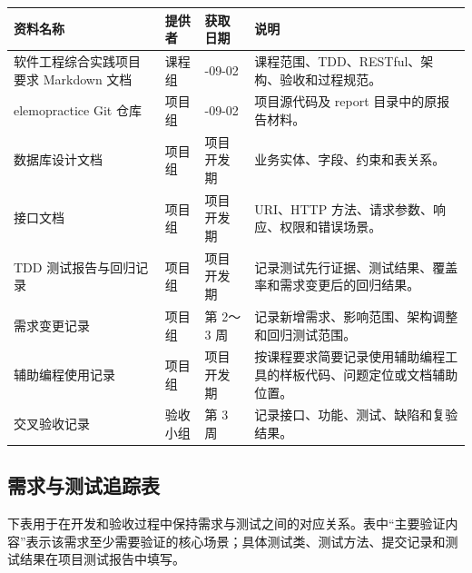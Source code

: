 \begin{longtable}{|>{\raggedright\arraybackslash}p{}|>{\raggedright\arraybackslash}p{}|>{\raggedright\arraybackslash}p{}|>{\raggedright\arraybackslash}p{}|}
\hline
\textbf{资料名称} & \textbf{提供者} & \textbf{获取日期} & \textbf{说明} \\ \hline
软件工程综合实践项目要求 Markdown 文档 & 课程组 & 2026-09-02 & 课程范围、TDD、RESTful、架构、验收和过程规范。 \\ \hline
elemopractice Git 仓库 & 项目组 & 2026-09-02 & 项目源代码及 report 目录中的原报告材料。 \\ \hline
数据库设计文档 & 项目组 & 项目开发期 & 业务实体、字段、约束和表关系。 \\ \hline
接口文档 & 项目组 & 项目开发期 & URI、HTTP 方法、请求参数、响应、权限和错误场景。 \\ \hline
TDD 测试报告与回归记录 & 项目组 & 项目开发期 & 记录测试先行证据、测试结果、覆盖率和需求变更后的回归结果。 \\ \hline
需求变更记录 & 项目组 & 第 2～3 周 & 记录新增需求、影响范围、架构调整和回归测试范围。 \\ \hline
辅助编程使用记录 & 项目组 & 项目开发期 & 按课程要求简要记录使用辅助编程工具的样板代码、问题定位或文档辅助位置。 \\ \hline
交叉验收记录 & 验收小组 & 第 3 周 & 记录接口、功能、测试、缺陷和复验结果。 \\ \hline
\end{longtable}

\subsection{需求与测试追踪表}

下表用于在开发和验收过程中保持需求与测试之间的对应关系。表中“主要验证内容”表示该需求至少需要验证的核心场景；具体测试类、测试方法、提交记录和测试结果在项目测试报告中填写。


